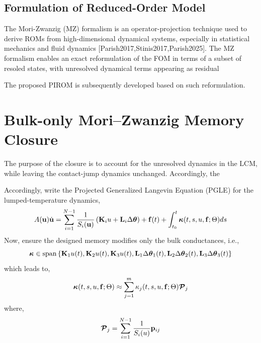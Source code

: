 \subsection{Formulation of Reduced-Order Model}

The Mori-Zwanzig (MZ) formalism is an operator-projection technique used to derive ROMs from high-dimensional dynamical systems, especially in statistical mechanics and fluid dynamics [Parish2017,Stinis2017,Parish2025]. The MZ formalism enables an exact reformulation of the FOM in terms of a subset of resoled states, with unresolved dynamical terms appearing as residual 

The proposed PIROM is subsequently developed based on such reformulation.



\section{Bulk-only Mori--Zwanzig Memory Closure}

The purpose of the closure is to account for the unresolved dynamics in the LCM, while leaving the contact-jump dynamics unchanged. Accordingly, the 


Accordingly, write the Projected Generalized Langevin Equation (PGLE) for the lumped-temperature dynamics,
\begin{equation}
    A(\mathbf{u})\dot{\mathbf{u}} = \sum_{i=1}^{N-1}\frac{1}{S_i(\mathbf{u})}\left(\mathbf{K}_i u + \mathbf{L}_i\Delta\boldsymbol{\theta}\right) + \mathbf{f}(t) + \int_{t_0}^{t}\boldsymbol{\kappa}(t,s,u,\mathbf{f};\Theta)ds
\end{equation}
Now, ensure the designed memory modifies only the bulk conductances, i.e.,
\begin{equation}
    \boldsymbol{\kappa}\in\text{span}\left\{\mathbf{K}_1 u(t), \mathbf{K}_2 u(t), \mathbf{K}_3 u(t), \mathbf{L}_1 \Delta\boldsymbol{\theta}_1(t), \mathbf{L}_2 \Delta\boldsymbol{\theta}_2(t), \mathbf{L}_3 \Delta\boldsymbol{\theta}_3(t)\right\}
\end{equation}
which leads to,
\begin{equation}
    \boldsymbol{\kappa}(t,s,u,\mathbf{f};\Theta) \approx \sum_{j=1}^{m}\kappa_j(t,s,u,\mathbf{f};\Theta)\boldsymbol{\mathcal{P}}_j
\end{equation}
where,
\begin{equation}
    \boldsymbol{\mathcal{P}}_j = \sum_{i=1}^{N-1}\frac{1}{S_i(u)}\mathbf{p}_{ij}
\end{equation}

